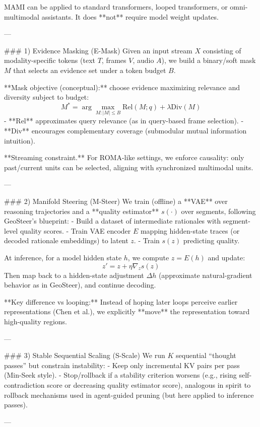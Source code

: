 MAMI can be applied to standard transformers, looped transformers, or omni-multimodal assistants. It does **not** require model weight updates.

---

### 1) Evidence Masking (E-Mask)  
Given an input stream \(X\) consisting of modality-specific tokens (text \(T\), frames \(V\), audio \(A\)), we build a binary/soft mask \(M\) that selects an evidence set under a token budget \(B\).

**Mask objective (conceptual):** choose evidence maximizing relevance and diversity subject to budget:
\[
M^* = \arg\max_{M: |M|\le B} \text{Rel}(M; q) + \lambda \text{Div}(M)
\]
- **Rel** approximates query relevance (as in query-based frame selection).
- **Div** encourages complementary coverage (submodular mutual information intuition).

**Streaming constraint.** For ROMA-like settings, we enforce causality: only past/current units can be selected, aligning with synchronized multimodal units.

---

### 2) Manifold Steering (M-Steer)  
We train (offline) a **VAE** over reasoning trajectories and a **quality estimator** \(s(\cdot)\) over segments, following GeoSteer’s blueprint:
- Build a dataset of intermediate rationales with segment-level quality scores.
- Train VAE encoder \(E\) mapping hidden-state traces (or decoded rationale embeddings) to latent \(z\).
- Train \(s(z)\) predicting quality.

At inference, for a model hidden state \(h\), we compute \(z=E(h)\) and update:
\[
z' = z + \eta \nabla_z s(z)
\]
Then map back to a hidden-state adjustment \(\Delta h\) (approximate natural-gradient behavior as in GeoSteer), and continue decoding.

**Key difference vs looping:** Instead of hoping later loops perceive earlier representations (Chen et al.), we explicitly **move** the representation toward high-quality regions.

---

### 3) Stable Sequential Scaling (S-Scale)  
We run \(K\) sequential “thought passes” but constrain instability:
- Keep only incremental KV pairs per pass (Min-Seek style).
- Stop/rollback if a stability criterion worsens (e.g., rising self-contradiction score or decreasing quality estimator score), analogous in spirit to rollback mechanisms used in agent-guided pruning (but here applied to inference passes).

---

